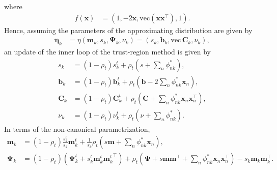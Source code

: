 \documentclass[a4paper]{article}
\begin{document}
			where
			\begin{align}
				f(\mathbf{x}) 
					&= \left(1, -2\mathbf{x}, \text{vec}\left(\mathbf{x}\mathbf{x}^\top\right), 1 \right).
			\end{align}
			Hence, assuming the parameters of the approximating distribution are given by
			\begin{align}
				\bm{\eta}_k 
				&= \eta(\mathbf{m}_k, s_k, \bm{\Psi}_k, \nu_k)
				= \left( s_k, \mathbf{b}_k, \text{vec}\, \mathbf{C}_k, \nu_k \right),
			\end{align}
			an update of the inner loop of the trust-region method is given by
			\begin{align}
				s_k &= (1 - \rho_t) s_k^t + \rho_t \left( s + \sum_n \phi_{nk}^* \right), \\
				\mathbf{b}_k &= (1 - \rho_t) \mathbf{b}_k^t + \rho_t \left( \mathbf{b} - 2 \sum_n \phi_{nk}^* \mathbf{x}_n \right), \\
				\mathbf{C}_k &= (1 - \rho_t) \mathbf{C}_k^t + \rho_t \left(\mathbf{C} + \sum_n \phi_{nk}^* \mathbf{x}_n\mathbf{x}_n^\top \right), \\
				\nu_k &= (1 - \rho_t) \nu_k^t + \rho_t \left(\nu + \sum_n \phi_{nk}^* \right).
			\end{align}
			In terms of the non-canonical parametrization,
			\begin{align}
				\mathbf{m}_k &= (1 - \rho_t) \frac{s_k^t}{s_k} \mathbf{m}_k^t + \frac{1}{s_k} \rho_t \left( s\mathbf{m} + \sum_n \phi_{nk}^* \mathbf{x}_n \right), \\
				\bm{\Psi}_k &= (1 - \rho_t) \left(\bm{\Psi}_k^t + s_k^t\mathbf{m}_k^t{\mathbf{m}_k^t}^\top\right) + \rho_t \left(\bm{\Psi} + s\mathbf{m}\mathbf{m}^\top + \sum_n \phi_{nk}^* \mathbf{x}_n\mathbf{x}_n^\top \right) - s_k\mathbf{m}_k\mathbf{m}_k^\top.
			\end{align}
\end{document}
